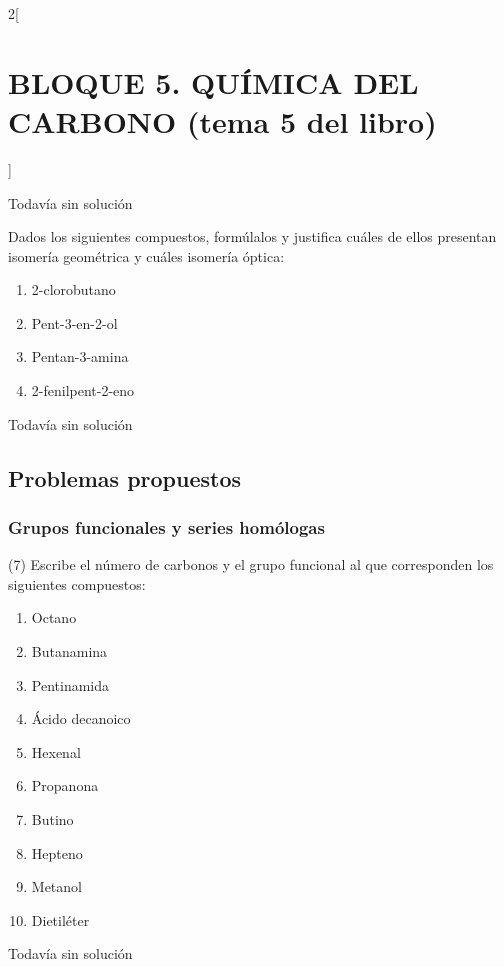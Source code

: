 \documentclass[10pt]{article}
\begin{document}
\begin{multicols}{2}[
  \section{BLOQUE 5. QUÍMICA DEL CARBONO (tema 5 del libro)}
  ]
\begin{solution}[print=false]
  Todavía sin solución
\end{solution}

\begin{exercise}
  Dados los siguientes compuestos, formúlalos y justifica cuáles
  de ellos presentan isomería geométrica y cuáles isomería
  óptica:
  \begin{enumerate}
    \item 2-clorobutano
    \item Pent-3-en-2-ol
    \item Pentan-3-amina
    \item 2-fenilpent-2-eno
  \end{enumerate}
\end{exercise}

\begin{solution}[print=false]
  Todavía sin solución
\end{solution}


\subsection{Problemas propuestos}

\subsubsection{Grupos funcionales y series homólogas}

\begin{exercise}
  (7) Escribe el número de carbonos y el grupo funcional al que
  corresponden los siguientes compuestos:
  \begin{enumerate}
    \item Octano
    \item Butanamina
    \item Pentinamida
    \item Ácido decanoico
    \item Hexenal
    \item Propanona
    \item Butino
    \item Hepteno
    \item Metanol
    \item Dietiléter
  \end{enumerate}
\end{exercise}

\begin{solution}[print=false]
  Todavía sin solución
\end{solution}


\end{multicols}
\end{document}
